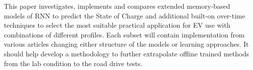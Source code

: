 %
%
%
%
%
This paper investigates, implements and compares extended memory-based models of RNN to predict the State of Charge and additional built-on over-time techniques to select the most suitable practical application for EV use with combinations of different profiles.
Each subset will contain implementation from various articles changing either structure of the models or learning approaches.
It should help develop a methodology to further extrapolate offline trained methods from the lab condition to the road drive tests.
